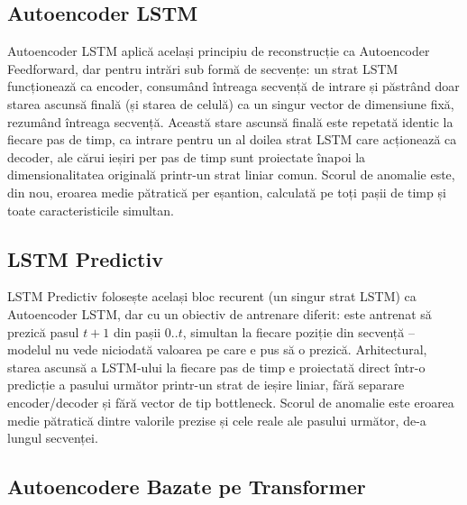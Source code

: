 \subsection{Autoencoder LSTM}

Autoencoder LSTM aplică același principiu de reconstrucție ca Autoencoder Feedforward, dar pentru intrări sub formă de secvențe: un strat LSTM funcționează ca encoder, consumând întreaga secvență de intrare și păstrând doar starea ascunsă finală (și starea de celulă) ca un singur vector de dimensiune fixă, rezumând întreaga secvență. Această stare ascunsă finală este repetată identic la fiecare pas de timp, ca intrare pentru un al doilea strat LSTM care acționează ca decoder, ale cărui ieșiri per pas de timp sunt proiectate înapoi la dimensionalitatea originală printr-un strat liniar comun.
Scorul de anomalie este, din nou, eroarea medie pătratică per eșantion, calculată pe toți pașii de timp și toate caracteristicile simultan.

\subsection{LSTM Predictiv}

LSTM Predictiv folosește același bloc recurent (un singur strat LSTM) ca Autoencoder LSTM, dar cu un obiectiv de antrenare diferit: este antrenat să prezică pasul $t+1$ din pașii $0..t$, simultan la fiecare poziție din secvență -- modelul nu vede niciodată valoarea pe care e pus să o prezică. Arhitectural, starea ascunsă a LSTM-ului la fiecare pas de timp e proiectată direct într-o predicție a pasului următor printr-un strat de ieșire liniar, fără separare encoder/decoder și fără vector de tip bottleneck.
Scorul de anomalie este eroarea medie pătratică dintre valorile prezise și cele reale ale pasului următor, de-a lungul secvenței.

\subsection{Autoencodere Bazate pe Transformer}

